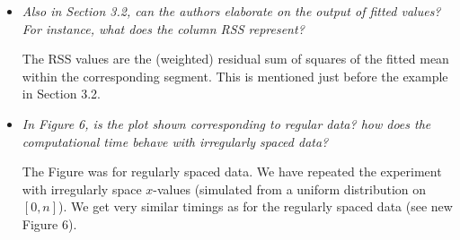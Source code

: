 \documentclass[12pt]{article}
\begin{document}
\begin{itemize}
\item {\em   Also in Section 3.2, can the authors elaborate on the output of fitted values? For instance, what does the column RSS represent?}

The RSS values are the (weighted) residual sum of squares of the fitted mean within the corresponding segment. This is mentioned just before the example in Section 3.2.

\item {\em  In Figure 6, is the plot shown corresponding to regular data? how does the computational time behave with irregularly spaced data? }

The Figure was for regularly spaced data. We have repeated the experiment with irregularly space $x$-values (simulated from a uniform distribution on $[0,n]$). We get very similar timings as for the regularly spaced data (see new Figure 6).

\end{itemize}
\end{document}
